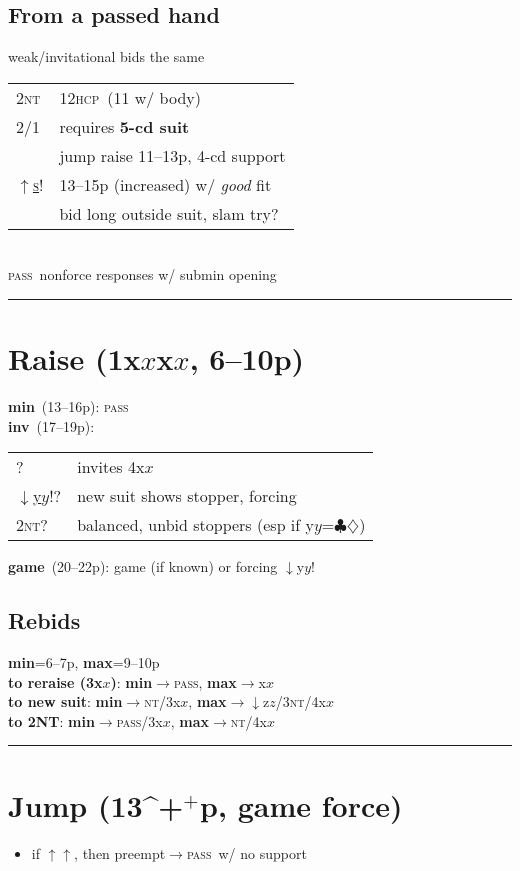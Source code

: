 \documentclass[landscape]{article}
\def\unbid#1{\uline{#1}}
\def\raise#1{\uwave{#1}}
\newcommand{\optionalmath}[1]{\ifmmode#1\else$#1$\fi}
\let\mathto\to
\def\to{\optionalmath\mathto}
\def\+{\optionalmath{^+}}
\def\C{\optionalmath\clubsuit}
\def\D{\optionalmath\diamondsuit}
\def\NT{\ifmmode\mathsc{nt}\else\textsc{nt}\fi}
\def\HCP{\textsc{hcp}}
\def\P{\textsc{pass}}
\def\s{\textsc{s}}
\def\x{\optionalmath x}
\def\y{\optionalmath y}
\def\z{\optionalmath z}
\def\ks{\kern2pt\s\kern2pt}
\def\li{\indent\phantom{li}}
\def\force{!}
\def\inv{?}
\def\nojump{\optionalmath\downarrow}
\def\jump{\optionalmath\uparrow}
\def\bmin{\textbf{min}}
\def\binv{\textbf{inv}}
\def\bgame{\textbf{game}}
\def\bmax{\textbf{max}}
\def\setcc#1#2{\def\cc{\crunch[#1]}\def\cca{\crunch[#2]}}
\newcommand{\crunch}[1][.6]{\vspace*{-#1pc}}
\renewcommand{\bullet}[1]{\begin{itemize}\item#1\end{itemize}}
\newenvironment{column}[1][0.33]{\begin{minipage}[t]{#1\columnwidth}}{\end{minipage}}
\begin{document}
\begin{column}\setcc{.5}{.2}

\subsection{From a passed hand}\cca
\li weak/invitational bids the same\\
\begin{tabular}{ll}
  2\NT & 12\HCP\ (11 w/ body)\\
  2/1  & requires \textbf{5-cd suit}\\
  \raise{\jump\ks} & jump raise 11--13p, 4-cd support\\
  \unbid{\jump\s}\force & 13--15p (increased) w/ \emph{good} fit\\
                      & bid long outside suit, slam try?
\end{tabular}\\
\li \P\ nonforce responses w/ submin opening

\crunch[-.8]\hrule

\cc\section{Raise (1\x-2\x, 6--10p)}\cca
\bmin\ (13--16p): \P\\
\binv\ (17--19p):\\
\begin{tabular}{ll}
  \raise{\nojump3\x}\inv  & invites 4\x\\
  \unbid{\nojump\y}\force\inv & new suit shows stopper, forcing\\
  2\NT\inv & balanced, unbid stoppers (esp if \y=\C\D)\\
\end{tabular}
\bgame\ (20--22p): game (if known) or forcing \nojump\y\force

\cc\subsection{Rebids}\cca
\bmin=6--7p, \bmax=9--10p\\[6pt]
\textbf{to reraise (3\x)}: \bmin\to\P, \bmax\to4\x\\
\textbf{to new suit}: \bmin\to2\NT/3\x, \bmax\to\nojump\z/3\NT/4\x\\
\textbf{to 2NT}: \bmin\to\P/3\x, \bmax\to3\NT/4\x\\

\crunch[-.8]\hrule

\cc\section{Jump (13\+p, game force)}\cca
\bullet{if \jump\jump, then preempt\to\P\ w/ no support}


\end{column}
\end{document}
